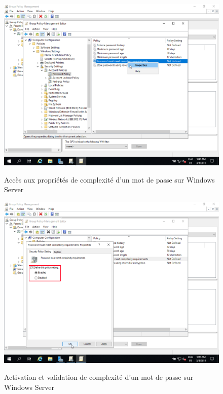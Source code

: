 \begin{figure}[h!]
	\begin{center}
		\caption{Accès aux propriétés de complexité d'un mot de passe sur Windows Server}
		\includegraphics[scale=0.5]{WS_Screenshots/gpo_10.png}
		\label{WS_Screenshots/gpo_10}
	\end{center}
\end{figure}
\FloatBarrier 
    

\begin{figure}[h!]
	\begin{center}
		\caption{Activation et validation de complexité d'un mot de passe sur Windows Server}
		\includegraphics[scale=0.5]{WS_Screenshots/gpo_11.png}
		\label{WS_Screenshots/gpo_11}
	\end{center}
\end{figure}
\FloatBarrier 
    

